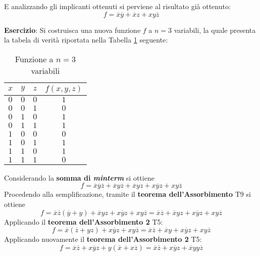 \documentclass[a4paper]{extarticle}
\renewcommand\arraystretch{}
\begin{document}
\noindent
E analizzando gli implicanti ottenuti si perviene al risultato già ottenuto:
\[f = \overline{x} \overline{y} + \overline{x} z + xy\overline{z}\]

\newpage
\noindent
\textbf{Esercizio}: Si costruisca una nuova funzione \(f\) a \(n = 3\) variabili, la quale presenta la tabela di verità riportata nella Tabella \ref{tab:funzione_3_variabili_5} seguente:

\begin{table}[H]
    \centering
    \setlength{\tabcolsep}{8pt}
    \renewcommand{\arraystretch}{1.2}
    \begin{tabular}{ccc|c}
      $x$ & $y$ & $z$ & $f(x, y, z)$\\
      \hline
      $0$ & $0$ & $0$ & $1$\\
      $0$ & $0$ & $1$ & $0$\\
      $0$ & $1$ & $0$ & $1$\\
      $0$ & $1$ & $1$ & $1$\\
      $1$ & $0$ & $0$ & $0$\\
      $1$ & $0$ & $1$ & $1$\\
      $1$ & $1$ & $0$ & $1$\\
      $1$ & $1$ & $1$ & $0$\\
    \end{tabular}
    \caption{Funzione a \(n = 3\) variabili}
    \label{tab:funzione_3_variabili_5}
\end{table}

\noindent
Considerando la \textbf{somma di \textit{minterm}} si ottiene
\[f = \overline{x} \overline{y} \overline{z} + \overline{x} y \overline{z} + \overline{x} y z + x \overline{y}z + xy \overline{z}\]
Procedendo alla semplificazione, tramite il \textbf{teorema dell'Assorbimento} T9 si ottiene
\[f = \overline{x}\overline{z}(\overline{y} + y) + \overline{x} y z + x \overline{y}z + xy \overline{z} = \overline{x}\overline{z} + \overline{x} y z + x\overline{y}z + xy \overline{z}\]
Applicando il \textbf{teorema dell'Assorbimento 2} T5:
\[f = \overline{x}(\overline{z} + yz) + x\overline{y}z + xy\overline{z} = \overline{x}\overline{z} + \overline{x}y + x \overline{y}z + xy\overline{z}\]
Applicando nuovamente il \textbf{teorema dell'Assorbimento 2} T5:
\[f = \overline{x}\overline{z} + x\overline{y}z + y(\overline{x} + x\overline{z}) = \overline{x}\overline{z} + x\overline{y}z + \overline{x}y  y\overline{z}\]
\end{document}
